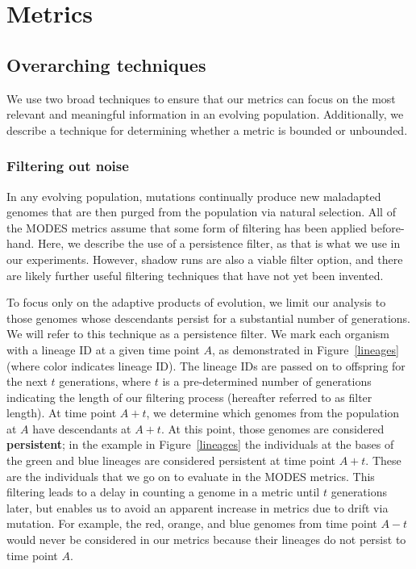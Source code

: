 \documentclass[letterpaper]{article}
\begin{document}
\section{Metrics}



\subsection{Overarching techniques}

We use two broad techniques to ensure that our metrics can focus on the most relevant and meaningful information in an evolving population. Additionally, we describe a technique for determining whether a metric is bounded or unbounded.

\subsubsection{Filtering out noise}

In any evolving population, mutations continually produce new maladapted genomes that are then purged from the population via natural selection. All of the MODES metrics assume that some form of filtering has been applied before-hand. Here, we describe the use of a persistence filter, as that is what we use in our experiments. However, shadow runs are also a viable filter option, and there are likely further useful filtering techniques that have not yet been invented.

To focus only on the adaptive products of evolution, we limit our analysis to those genomes whose descendants persist for a substantial number of generations. We will refer to this technique as a persistence filter. We mark each organism with a lineage ID at a given time point $A$, as demonstrated in Figure~\ref{lineages} (where color indicates lineage ID). The lineage IDs are passed on to offspring for the next $t$ generations, where $t$ is a pre-determined number of generations indicating the length of our filtering process (hereafter referred to as filter length). At time point $A+t$, we determine which genomes from the population at $A$ have descendants at $A+t$. At this point, those genomes are considered \textbf{persistent}; in the example in Figure~\ref{lineages} the individuals at the bases of the green and blue lineages are considered persistent at time point $A+t$. These are the individuals that we go on to evaluate in the MODES metrics. This filtering leads to a delay in counting a genome in a metric until $t$ generations later, but enables us to avoid an apparent increase in metrics due to drift via mutation. For example, the red, orange, and blue genomes from time point $A-t$ would never be considered in our metrics because their lineages do not persist to time point $A$.
    
\end{document}
